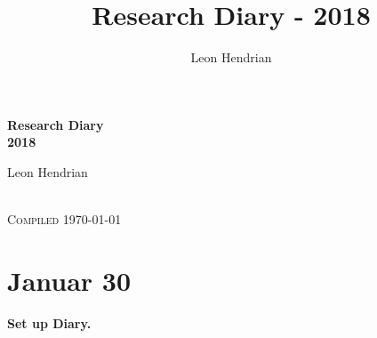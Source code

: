 \documentclass[a4paper,twoside,11pt]{report}
\title{Research Diary - 2018}
\author{Leon Hendrian}
\begin{document}
\begin{center} \begin{LARGE}
\textbf{Research Diary} \\[3mm]
\textbf{2018} \\[2cm]
\end{LARGE} \begin{large}
Leon Hendrian \end{large} \\
\textsc{Compiled \today}
\end{center}
\thispagestyle{empty}
\newpage
\tableofcontents
\thispagestyle{empty}



\chapter{Januar 30}
\textbf{Set up Diary.}
\section{}









\newpage
\printbibliography
\printindex
\end{document}
